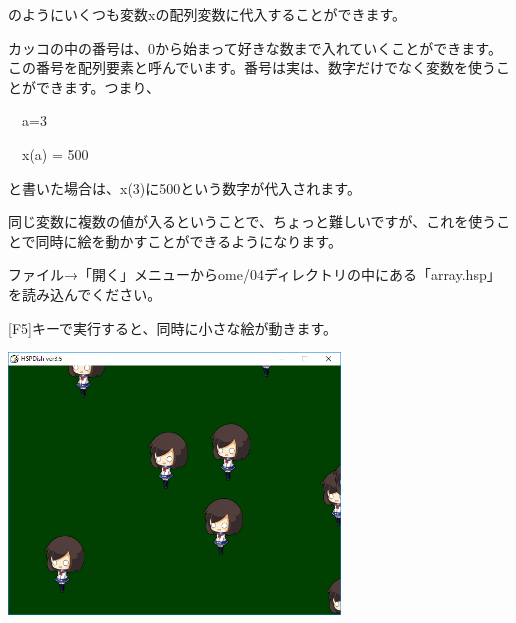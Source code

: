 \documentclass[a4paper,dvipdfmx]{jarticle}
\begin{document}
\bigskip

のようにいくつも変数xの配列変数に代入することができます。

カッコの中の番号は、0から始まって好きな数まで入れていくことができます。この番号を配列要素と呼んでいます。番号は実は、数字だけでなく変数を使うことができます。つまり、


\bigskip

\ \ a=3

\ \ x(a) = 500


\bigskip

と書いた場合は、x(3)に500という数字が代入されます。

同じ変数に複数の値が入るということで、ちょっと難しいですが、これを使うことで同時に絵を動かすことができるようになります。


\bigskip

ファイル→「開く」メニューからome/04ディレクトリの中にある「array.hsp」を読み込んでください。

[F5]キーで実行すると、同時に小さな絵が動きます。


\bigskip



\begin{center}
\includegraphics[width=8.811cm,height=6.946cm]{text04-img/text04-img036.png}

\end{center}

\bigskip


\bigskip


\bigskip


\bigskip


\bigskip


\bigskip


\bigskip


\bigskip


\bigskip
\end{document}
